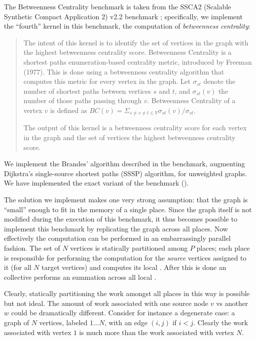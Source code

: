 The Betweenness Centrality benchmark is taken from the SSCA2 (Scalable
Synthetic Compact Application 2) v2.2 benchmark \cite{SSCA2};
specifically, we implement the ``fourth'' kernel in this benchmark,
the computation of {\em betweenness centrality}:

\begin{quotation}
The intent of this kernel is to identify the set of vertices in the
graph with the highest betweenness centrality score. Betweenness
Centrality is a shortest paths enumeration-based centrality
metric, introduced by Freeman (1977). This is done using a betweenness
centrality algorithm that computes this metric for every vertex in the
graph. Let $\sigma_{st}$ denote the number of shortest paths between
vertices $s$ and $t$, and $\sigma_{st}(v)$ the number of those paths
passing through $v$. Betweenness Centrality of a vertex $v$ is defined
as $BC(v) = \Sigma_{s\not=v\not=t \in V} \sigma_{st}(v)/\sigma_{st}$.

The output of this kernel is a betweenness centrality score for each
vertex in the graph and the set of vertices the highest betweenness
centrality score.
\end{quotation}

We implement the Brandes' algorithm described in the benchmark,
augmenting Dijkstra's single-source shortest paths (SSSP) algorithm,
for unweighted graphs. We have implemented the exact variant of the benchmark
(). 

The solution we implement makes one very strong assumption: that the
graph is ``small'' enough to fit in the memory of a single
place. Since the graph itself is not modified during the execution of
this benchmark, it thus becomes possible to implement this benchmark
by replicating the graph across all places. Now effectively the
computation can be performed in an embarrassingly parallel fashion. The
set of $N$ vertices is statically partitioned among $P$ places; each place is
responsible for performing the computation for the {\em source}
vertices assigned to it (for all $N$ target vertices) and computes its
local . After this is
done an  collective performs an  summation
    across all local . 

Clearly, statically partitioning the work amongst all places in this
way is possible but not ideal. The amount of work associated with one source node
$v$ vs another $w$ could be dramatically different. Consider for
instance a degenerate case: a graph of $N$ vertices, labeled $1\ldots
N$, with an edge $(i,j)$ if $i < j$. Clearly the work associated with
vertex $1$ is much more than the work associated with vertex $N$. 

